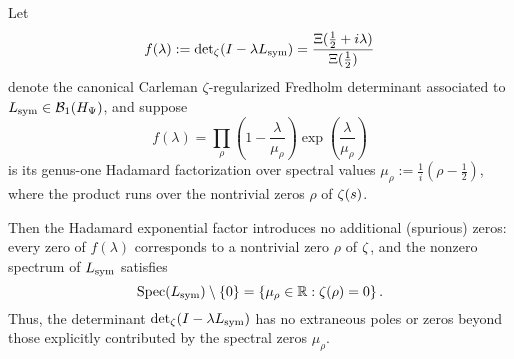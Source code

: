 \begin{lemma}
\label{lem:no_extraneous_zeros}
Let
\[
f(\lambda) := \det\nolimits_\zeta(I - \lambda L_{\mathrm{sym}}) = \frac{\Xi(\tfrac{1}{2} + i\lambda)}{\Xi(\tfrac{1}{2})}
\]
denote the canonical Carleman \(\zeta\)-regularized Fredholm determinant associated to \( L_{\mathrm{sym}} \in \mathcal{B}_1(H_{\Psi}) \), and suppose
\[
f(\lambda) = \prod_{\rho} \left(1 - \frac{\lambda}{\mu_\rho} \right) \exp\left( \frac{\lambda}{\mu_\rho} \right)
\]
is its genus-one Hadamard factorization over spectral values \( \mu_\rho := \frac{1}{i}(\rho - \tfrac{1}{2}) \), where the product runs over the nontrivial zeros \( \rho \) of \( \zeta(s) \).

Then the Hadamard exponential factor introduces no additional (spurious) zeros: every zero of \( f(\lambda) \) corresponds to a nontrivial zero \( \rho \) of \( \zeta \), and the nonzero spectrum of \( L_{\mathrm{sym}} \) satisfies
\[
\operatorname{Spec}(L_{\mathrm{sym}}) \setminus \{0\} = \left\{ \mu_\rho \in \mathbb{R} : \zeta(\rho) = 0 \right\}.
\]
Thus, the determinant \(\det\nolimits_\zeta(I - \lambda L_{\mathrm{sym}})\) has no extraneous poles or zeros beyond those explicitly contributed by the spectral zeros \( \mu_\rho \).
\end{lemma}
